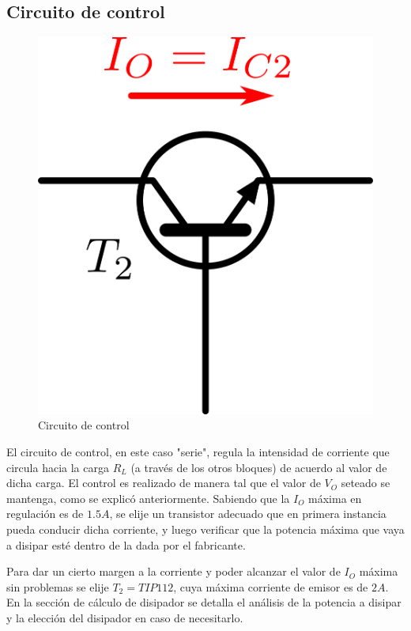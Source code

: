 \subsection{Circuito de control}

\begin{figure}[!ht]
\begin{centering}
\includegraphics[scale=0.5]{Imagenes/Control.png}
\par\end{centering}
\caption{Circuito de control}

\end{figure}

El circuito de control, en este caso "serie", regula la intensidad de corriente que circula hacia la carga $R_L$ (a trav\'es de los otros bloques) de acuerdo al valor de dicha carga. El control es realizado de manera tal que el valor de $V_O$ seteado se mantenga, como se explic\'o anteriormente.
Sabiendo que la $I_O$ m\'axima en regulaci\'on es de $1.5A$, se elije un transistor adecuado que en primera instancia pueda conducir dicha corriente, y luego verificar que la potencia m\'axima que vaya a disipar est\'e dentro de la dada por el fabricante.\par
Para dar un cierto margen a la corriente y poder alcanzar el valor de $I_O$ m\'axima sin problemas se elije $T_2 = TIP112$, cuya m\'axima corriente de emisor es de $2A$.
En la secci\'on de c\'alculo de disipador se detalla el an\'alisis de la potencia a disipar y la elecci\'on del disipador en caso de necesitarlo.

